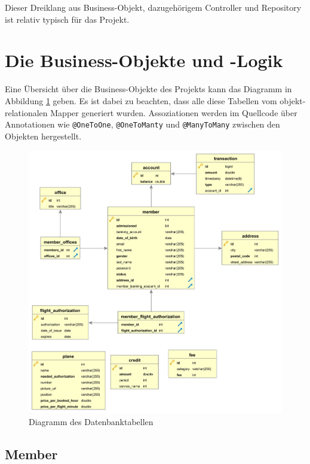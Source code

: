 \documentclass[a4paper, 11pt]{article}
\begin{document}
Dieser Dreiklang aus Business-Objekt, dazugehörigem Controller und Repository
ist relativ typisch für das Projekt.

\section{Die Business-Objekte und -Logik}

Eine Übersicht über die Business-Objekte des Projekts kann das Diagramm in
Abbildung \ref{fig:erm_all} geben. Es ist dabei zu beachten, dass alle diese
Tabellen vom objekt-relationalen Mapper generiert wurden. Assoziationen werden
im Quellcode über Annotationen wie \lstinline{@OneToOne},
\lstinline{@OneToManty} und \lstinline{@ManyToMany} zwischen den Objekten
hergestellt.

\begin{figure}[htpb]
    \centering
    \includegraphics[width=\textwidth]{images/erm/all_orthogonal.png}
    \caption{Diagramm des Datenbanktabellen}
    \label{fig:erm_all}
\end{figure}

\subsection{Member}
\end{document}

